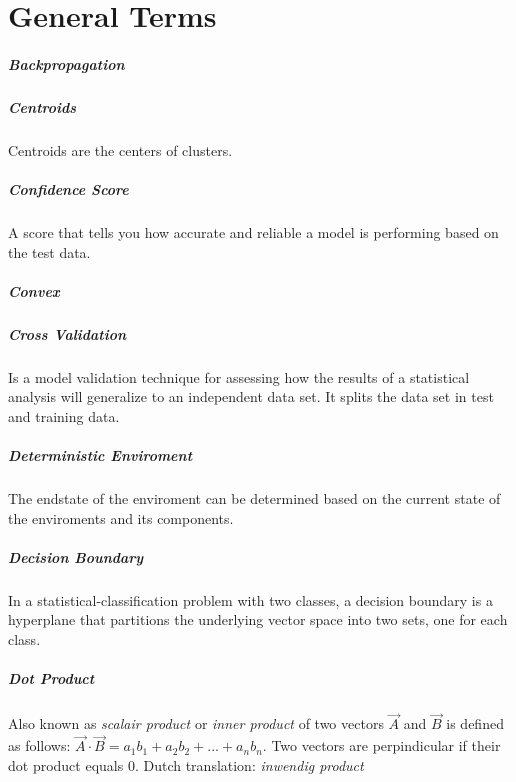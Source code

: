 \chapter{General Terms}\label{chap:general_terms}
\paragraph{Backpropagation}

\paragraph{Centroids}
Centroids are the centers of clusters.

\paragraph{Confidence Score} 
A score that tells you how accurate and reliable a model is performing based on the test data.

\paragraph{Convex}

\paragraph{Cross Validation} 
Is a model validation technique for assessing how the results of a statistical analysis will generalize to an independent data set. It splits the data set in test and training data.

\paragraph{Deterministic Enviroment}
The endstate of the enviroment can be determined based on the current state of the enviroments and its components.

\paragraph{Decision Boundary}
In a statistical-classification problem with two classes, a decision boundary is a hyperplane that partitions the underlying vector space into two sets, one for each class.

\paragraph{Dot Product}
Also known as \emph{scalair product} or \emph{inner product} of two vectors $\vec{A}$ and $\vec{B}$ is defined as follows: $\vec{A} \cdot \vec{B} = a_1 b_1 + a_2 b_2 + ... + a_n b_n$. Two vectors are perpindicular if their dot product equals 0. Dutch translation: \emph{inwendig product}

